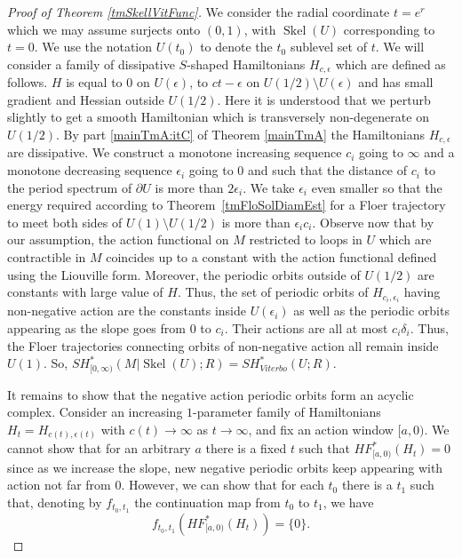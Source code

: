 \documentclass[11pt]{amsart}
\DeclareMathOperator{\Skel}{Skel}
\theoremstyle{definition}
\theoremstyle{remark}
\begin{document}
\begin{proof}[Proof of Theorem \ref{tmSkellVitFunc}]
We consider the radial coordinate $t=e^r$ which we may assume surjects onto $(0,1)$, with $\Skel(U)$ corresponding to $t=0$. We use the notation $U(t_0)$ to denote the $t_0$ sublevel set of $t$. We will consider a family of dissipative $S$-shaped Hamiltonians $H_{c,\epsilon}$ which are defined as follows. $H$ is equal to $0$ on $U(\epsilon)$, to $ct-\epsilon$ on $U(1/2)\setminus U(\epsilon)$ and has small gradient and Hessian outside $U(1/2)$. Here it is understood that we perturb slightly to get a smooth Hamiltonian which is transversely non-degenerate on $U(1/2)$. By part \ref{mainTmA:itC} of Theorem \ref{mainTmA} the Hamiltonians $H_{c,\epsilon}$ are dissipative. We construct a monotone increasing sequence $c_i$ going to $\infty$ and a monotone decreasing sequence $\epsilon_i$ going to $0$ and such that the distance of $c_i$ to the period spectrum of $\partial U$ is more than $2\epsilon_i$. We take $\epsilon_i$ even smaller so that the energy required according to Theorem~\ref{tmFloSolDiamEst} for a Floer trajectory to meet both sides of $U(1)\setminus U(1/2)$ is more than $\epsilon_i c_i$. Observe now that by our assumption, the action functional on $M$ restricted to loops in $U$ which are contractible in $M$ coincides up to a constant with the action functional defined using the Liouville form. Moreover, the periodic orbits outside of $U(1/2)$ are constants with large value of $H$. Thus, the set of periodic orbits of $H_{c_i,\epsilon_i}$ having non-negative action are the constants inside $U(\epsilon_i)$ as well as the periodic orbits appearing as the slope goes from $0$ to $c_i$.  Their actions are all at most $c_i\delta_i$. Thus, the Floer trajectories connecting orbits of non-negative action all remain inside $U(1)$. So, $SH^*_{[0,\infty)}(M|\Skel(U);R)=SH^*_{Viterbo}(U;R)$.

It remains to show that the negative action periodic orbits form an acyclic complex. Consider an increasing $1$-parameter family of Hamiltonians $H_t=H_{c(t),\epsilon(t)}$ with $c(t)\to\infty$ as $t\to\infty$, and fix an action window $[a,0)$.  We cannot show that for an arbitrary $a$ there is a fixed $t$ such that $HF^*_{[a,0)}(H_t)=0$ since as we increase the slope, new negative periodic orbits keep appearing with action not far from $0$. However, we can show that for each $t_0$ there is a $t_1$ such that, denoting by $f_{t_0,t_1}$ the continuation map from $t_0$ to $t_1$, we have
\[
f_{t_0,t_1}(HF^*_{[a,0)}(H_t))=\{0\}.
\]


\end{proof}
\end{document}
